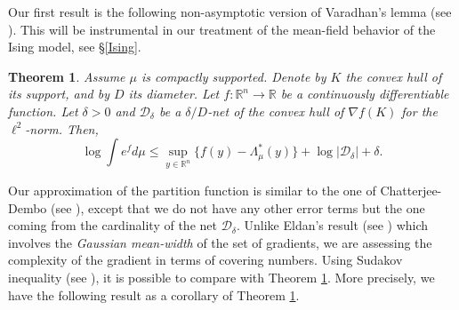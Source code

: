 \documentclass[aop,preprint]{imsart}
\newcommand\RR{\mathbb{R}}
\numberwithin{equation}{section}
\theoremstyle{definition}
\theoremstyle{plain}
\newtheorem{The}[Def]{Theorem}
\theoremstyle{remark}
\begin{document}
Our first result is the following non-asymptotic version of Varadhan's lemma (see \cite[Theorem 4.3.1]{DZ}). This will be instrumental in our treatment of the mean-field behavior of the Ising model, see \S \ref{Ising}.



\begin{The}\label{partitionfunc}
Assume $\mu$ is compactly supported. Denote by $K$ the convex hull of its support, and by $D$ its diameter.
Let $f : \RR^n \to \RR$ be a continuously differentiable function.
 Let $\delta>0$ and $\mathcal{D}_{\delta}$ be a $\delta/D$-net of the convex hull of $\nabla f(K)$ for the $\ell^2$-norm.  Then,
$$\log \int e^{f} d\mu \leq \sup_{y \in \RR^n}  \{ f(y) -\Lambda^*_\mu(y)\}  + \log |\mathcal{D}_{\delta}| +  \delta.$$
\end{The}

Our approximation of the partition function is similar to the one of Chatterjee-Dembo (see \cite[Theorem 1.6]{CD}), except that we do not have any other error terms but the one coming from the cardinality of the net $\mathcal{D}_\delta$. 	Unlike Eldan's result (see \cite[Corollary 2]{Eldan}) which involves the \textit{Gaussian mean-width} of the set of gradients, we are assessing the complexity of the gradient in terms of covering numbers. Using Sudakov inequality (see \cite[Theorem 3.18]{LT}), it is possible to compare \cite[Corollary 2]{Eldan} with Theorem \ref{partitionfunc}. More precisely, we have the following result as a corollary of Theorem \ref{partitionfunc}.   
\end{document}
